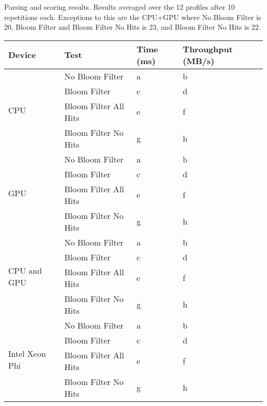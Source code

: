 Parsing and scoring results. Results averaged over the 12 profiles after 10
repetitions each. Exceptions to this are the CPU+GPU where No Bloom Filter is
20, Bloom Filter and Bloom Filter No Hits is 23, and Bloom Filter No Hits is 22.

\begin{tabular}{|l|l|l|l|}
\hline
Device & Test & Time (ms) & Throughput (MB/s)\\
\hline
\multirow{4}{*}{CPU}
& No Bloom Filter & a & b \\
& Bloom Filter & c & d \\
& Bloom Filter All Hits & e & f \\
& Bloom Filter No Hits & g & h \\
\hline
\multirow{4}{*}{GPU}
& No Bloom Filter & a & b \\
& Bloom Filter & c & d \\
& Bloom Filter All Hits & e & f \\
& Bloom Filter No Hits & g & h \\
\hline
\multirow{4}{*}{CPU and GPU}
& No Bloom Filter & a & b \\
& Bloom Filter & c & d \\
& Bloom Filter All Hits & e & f \\
& Bloom Filter No Hits & g & h \\
\hline
\multirow{4}{*}{Intel Xeon Phi}
& No Bloom Filter & a & b \\
& Bloom Filter & c & d \\
& Bloom Filter All Hits & e & f \\
& Bloom Filter No Hits & g & h \\
\hline
\end{tabular}
